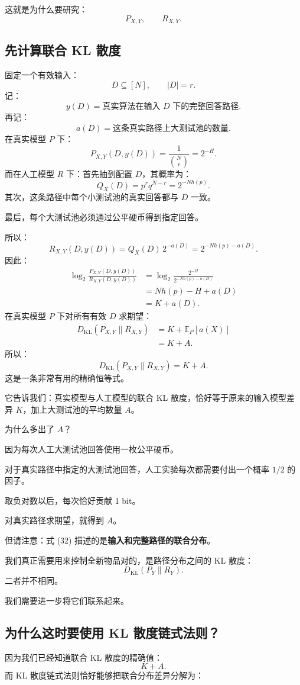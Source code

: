 \documentclass[UTF8,11pt]{ctexart}
\begin{document}
这就是为什么要研究：
\[P_{X,Y},\qquad R_{X,Y}.\]

\subsection{先计算联合 KL 散度}
固定一个有效输入：
\[D\subseteq[N],\qquad |D|=r.\]
记：
\[y(D)=\text{真实算法在输入 }D\text{ 下的完整回答路径}.\]
再记：
\[a(D)=\text{这条真实路径上大测试池的数量}.\]
在真实模型 $P$ 下：
\[P_{X,Y}(D,y(D))=\frac1{\binom Nr}=2^{-H}.\]
而在人工模型 $R$ 下：首先抽到配置 $D$，其概率为：
\[Q_X(D)=p^rq^{N-r}=2^{-Nh(p)}.\]
其次，这条路径中每个小测试池的真实回答都与 $D$ 一致。

最后，每个大测试池必须通过公平硬币得到指定回答。

所以：
\[R_{X,Y}(D,y(D))=Q_X(D)\,2^{-a(D)}=2^{-Nh(p)-a(D)}.\]
因此：
\[
\begin{aligned}
\log_2\frac{P_{X,Y}(D,y(D))}{R_{X,Y}(D,y(D))}
&=\log_2\frac{2^{-H}}{2^{-Nh(p)-a(D)}}\\
&=Nh(p)-H+a(D)\\
&=K+a(D).
\end{aligned}
\]
在真实模型 $P$ 下对所有有效 $D$ 求期望：
\[
\begin{aligned}
D_{\mathrm{KL}}(P_{X,Y}\|R_{X,Y})
&=K+\mathbb E_P[a(X)]\\
&=K+A.
\end{aligned}
\]
所以：
\begin{equation}\boxed{D_{\mathrm{KL}}(P_{X,Y}\|R_{X,Y})=K+A.}\tag{32}\end{equation}
这是一条非常有用的精确恒等式。

它告诉我们：真实模型与人工模型的联合 KL 散度，恰好等于原来的输入模型差异 $K$，加上大测试池的平均数量 $A$。

为什么多出了 $A$？

因为每次人工大测试池回答使用一枚公平硬币。

对于真实路径中指定的大测试池回答，人工实验每次都需要付出一个概率 $1/2$ 的因子。

取负对数以后，每次恰好贡献 1 bit。

对真实路径求期望，就得到 $A$。

但请注意：式 (32) 描述的是\textbf{输入和完整路径的联合分布}。

我们真正需要用来控制全新物品对的，是路径分布之间的 KL 散度：
\[D_{\mathrm{KL}}(P_Y\|R_Y).\]
二者并不相同。

我们需要进一步将它们联系起来。

\subsection{为什么这时要使用 KL 散度链式法则？}
因为我们已经知道联合 KL 散度的精确值：
\[K+A.\]
而 KL 散度链式法则恰好能够把联合分布差异分解为：
\end{document}
